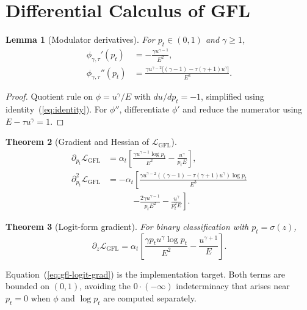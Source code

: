 \documentclass[conference]{IEEEtran}
\newtheorem{theorem}{Theorem}
\newtheorem{lemma}[theorem]{Lemma}
\theoremstyle{definition}
\newcommand{\LGFL}{\mathcal{L}_{\mathrm{GFL}}}
\begin{document}
\section{Differential Calculus of GFL}
\label{sec:derivs}

\begin{lemma}[Modulator derivatives]\label{lem:phi-deriv}
For $p_t \in (0,1)$ and $\gamma \ge 1$,
\begin{align}
\phi_{\gamma,\tau}'(p_t) &= -\frac{\gamma u^{\gamma-1}}{E^2}, \label{eq:phi-prime}\\
\phi_{\gamma,\tau}''(p_t) &= \frac{\gamma u^{\gamma-2}\bigl[(\gamma-1)-\tau(\gamma+1)u^\gamma\bigr]}{E^3}. \label{eq:phi-pprime}
\end{align}
\end{lemma}

\begin{proof}
Quotient rule on $\phi = u^\gamma / E$ with $du/dp_t = -1$, simplified using identity~(\ref{eq:identity}). For $\phi''$, differentiate $\phi'$ and reduce the numerator using $E - \tau u^\gamma = 1$.
\end{proof}

\begin{theorem}[Gradient and Hessian of $\LGFL$]\label{thm:loss-deriv}
\begin{align}
\partial_{p_t}\LGFL &= \alpha_t\!\left[\frac{\gamma u^{\gamma-1}\log p_t}{E^2} - \frac{u^\gamma}{p_t E}\right], \label{eq:gfl-grad}\\
\partial^2_{p_t}\LGFL &= -\alpha_t\!\left[\frac{\gamma u^{\gamma-2}((\gamma-1){-}\tau(\gamma{+}1)u^\gamma)\log p_t}{E^3}\right.\nonumber\\
&\qquad\quad \left. - \frac{2\gamma u^{\gamma-1}}{p_t E^2} - \frac{u^\gamma}{p_t^2 E}\right]. \label{eq:gfl-hess}
\end{align}
\end{theorem}

\begin{theorem}[Logit-form gradient]\label{thm:logit-grad}
For binary classification with $p_t = \sigma(z)$,
\begin{equation}
\partial_z \LGFL = \alpha_t\!\left[\frac{\gamma p_t u^\gamma \log p_t}{E^2} - \frac{u^{\gamma+1}}{E}\right].
\label{eq:gfl-logit-grad}
\end{equation}
\end{theorem}

Equation~(\ref{eq:gfl-logit-grad}) is the implementation target. Both terms are bounded on $(0,1)$, avoiding the $0 \cdot (-\infty)$ indeterminacy that arises near $p_t = 0$ when $\phi$ and $\log p_t$ are computed separately.
\end{document}
